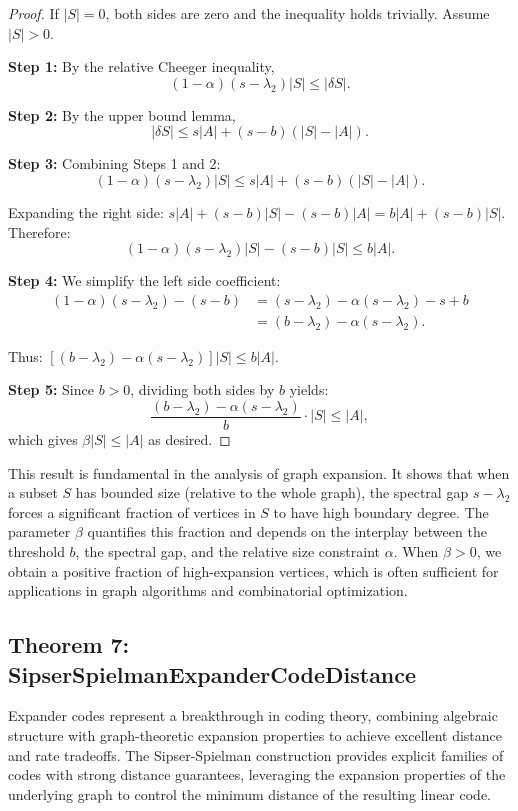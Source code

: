 \documentclass[11pt]{article}
\theoremstyle{plain}
\theoremstyle{definition}
\theoremstyle{remark}
\begin{document}
\begin{proof}
If $|S| = 0$, both sides are zero and the inequality holds trivially. Assume $|S| > 0$.

\textbf{Step 1:} By the relative Cheeger inequality,
\[
(1-\alpha)(s - \lambda_2)|S| \leq |\delta S|.
\]

\textbf{Step 2:} By the upper bound lemma,
\[
|\delta S| \leq s|A| + (s-b)(|S| - |A|).
\]

\textbf{Step 3:} Combining Steps 1 and 2:
\[
(1-\alpha)(s-\lambda_2)|S| \leq s|A| + (s-b)(|S| - |A|).
\]

Expanding the right side: $s|A| + (s-b)|S| - (s-b)|A| = b|A| + (s-b)|S|$. Therefore:
\[
(1-\alpha)(s-\lambda_2)|S| - (s-b)|S| \leq b|A|.
\]

\textbf{Step 4:} We simplify the left side coefficient:
\begin{align}
(1-\alpha)(s-\lambda_2) - (s-b) &= (s-\lambda_2) - \alpha(s-\lambda_2) - s + b \\
&= (b - \lambda_2) - \alpha(s-\lambda_2).
\end{align}

Thus: $[(b-\lambda_2) - \alpha(s-\lambda_2)]|S| \leq b|A|$.

\textbf{Step 5:} Since $b > 0$, dividing both sides by $b$ yields:
\[
\frac{(b-\lambda_2) - \alpha(s-\lambda_2)}{b} \cdot |S| \leq |A|,
\]
which gives $\beta |S| \leq |A|$ as desired.
\end{proof}

This result is fundamental in the analysis of graph expansion. It shows that when a subset $S$ has bounded size (relative to the whole graph), the spectral gap $s - \lambda_2$ forces a significant fraction of vertices in $S$ to have high boundary degree. The parameter $\beta$ quantifies this fraction and depends on the interplay between the threshold $b$, the spectral gap, and the relative size constraint $\alpha$. When $\beta > 0$, we obtain a positive fraction of high-expansion vertices, which is often sufficient for applications in graph algorithms and combinatorial optimization.

\vspace{1em}

\subsection{Theorem 7: SipserSpielmanExpanderCodeDistance}

Expander codes represent a breakthrough in coding theory, combining algebraic structure with graph-theoretic expansion properties to achieve excellent distance and rate tradeoffs. The Sipser-Spielman construction provides explicit families of codes with strong distance guarantees, leveraging the expansion properties of the underlying graph to control the minimum distance of the resulting linear code.
\end{document}
